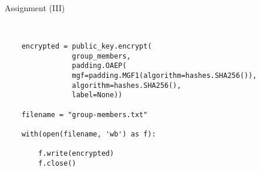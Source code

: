 \begin{frame}[fragile]{Assignment (III)}

	\begin{verbatim}


	encrypted = public_key.encrypt(
                group_members,
                padding.OAEP(
                mgf=padding.MGF1(algorithm=hashes.SHA256()),
                algorithm=hashes.SHA256(),
                label=None))

	filename = "group-members.txt"

	with(open(filename, 'wb') as f):

		f.write(encrypted)
		f.close()

	\end{verbatim}

	\end{frame}


